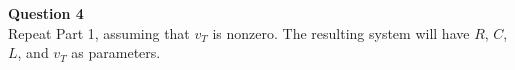 \documentclass[preview]{standalone}
\begin{document}
\begin{center}
\raggedright
                    \textbf{Question 4}\\
                    Repeat Part 1, assuming that $v_T$ is nonzero. The resulting system will have $R$, $C$, $L$,
                    and $v_T$ as parameters.
\end{center}
\end{document}
